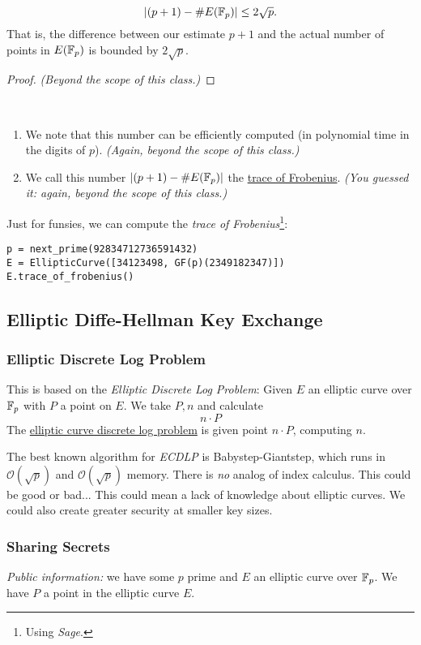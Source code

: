 \begin{theorem}
    \[|(p+1) - \#E(\mathbb F_p)| \leq 2\sqrt{p}.\] That is, the difference between our estimate $p+1$ and the actual number of points in $E(\mathbb F_p)$ is bounded by $2\sqrt{p}$.
\end{theorem}
\begin{proof}
    \emph{(Beyond the scope of this class.)}
\end{proof}

\begin{remark}
    ~\begin{enumerate}
        \item We note that this number can be efficiently computed (in polynomial time in the digits of $p$). \emph{(Again, beyond the scope of this class.)}
        \item We call this number $|(p+1) - \#E(\mathbb F_p)|$ the \ul{trace of Frobenius}. \emph{(You guessed it: again, beyond the scope of this class.)}
    \end{enumerate}
\end{remark}

Just for funsies, we can compute the \emph{trace of Frobenius}\footnote{Using \emph{Sage}.}:
\begin{lstlisting}
p = next_prime(92834712736591432)
E = EllipticCurve([34123498, GF(p)(2349182347)])
E.trace_of_frobenius()
\end{lstlisting}

\subsection{Elliptic Diffe-Hellman Key Exchange}
\subsubsection{Elliptic Discrete Log Problem}
This is based on the \emph{Elliptic Discrete Log Problem}:
Given $E$ an elliptic curve over $\mathbb F_p$ with $P$ a point on $E$. We take $P, n$ and calculate
\[n\cdot P\]
The \ul{elliptic curve discrete log problem} is given point $n\cdot P$, computing $n$.

The best known algorithm for \emph{ECDLP} is Babystep-Giantstep, which runs in $\mathcal{O}(\sqrt{p})$ and $\mathcal{O}(\sqrt{p})$ memory. There is \emph{no} analog of index calculus. This could be good or bad... This could mean a lack of knowledge about elliptic curves. We could also create greater security at smaller key sizes.

\subsubsection{Sharing Secrets}
\emph{Public information:} we have some $p$ prime and $E$ an elliptic curve over $\mathbb F_p$. We have $P$ a point in the elliptic curve $E$.


